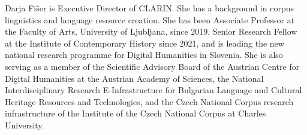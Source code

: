Darja Fišer is Executive Director of CLARIN.
She has a background in corpus linguistics and language resource creation.
She has been Associate Professor at the Faculty of Arts, University of Ljubljana, since 2019, Senior Research Fellow at the Institute of Contemporary History since 2021, and is leading the new national research programme for Digital Humanities in Slovenia.
She is also serving as a member of the Scientific Advisory Board of the Austrian Centre for Digital Humanities at the Austrian Academy of Sciences, the National Interdisciplinary Research E-Infrastructure for Bulgarian Language and Cultural Heritage Resources and Technologies, and the Czech National Corpus research infrastructure of the Institute of the Czech National Corpus at Charles University.